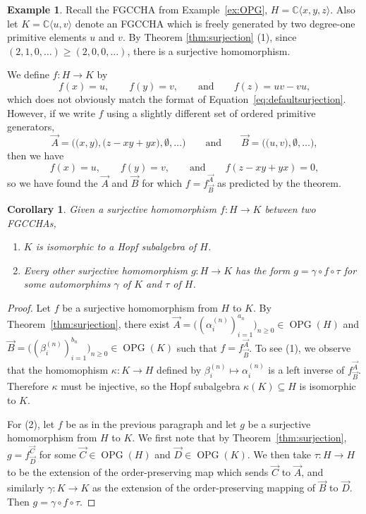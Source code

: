 \documentclass[11pt]{amsart}
\newtheorem{corollary}[theorem]{Corollary}
\theoremstyle{definition}
\newtheorem{example}[theorem]{Example}
\numberwithin{equation}{section}
\def\CC{{\mathbb C}}
\newcommand{\FGCCHA}{\textsf{FGCCHA}\xspace}
\newcommand{\FGCCHAs}{\textsf{FGCCHA}s\xspace}
\newcommand{\OPG}{\operatorname{OPG}}
\begin{document}
\begin{example}
\label{ex:quotientHopf}
Recall the \FGCCHA from Example~\ref{ex:OPG}, $H = \CC\langle x, y, z \rangle$.
Also let $K = \CC\langle u, v \rangle$ denote an \FGCCHA
which is freely generated by two degree-one primitive elements $u$ and $v$. 
By Theorem \ref{thm:surjection} (1), since $(2,1,0,\ldots) \geq (2,0,0,\ldots)$,
there is a surjective homomorphism.

We define $f: H \to K$ by
\[
f(x) = u,
\qquad
f(y) = v,
\qquad\text{and}\qquad
f(z) = uv-vu,
\]
which does not obviously match the format of Equation~\eqref{eq:defaultsurjection}.  However, if we write $f$ using a slightly different set of ordered primitive generators,
\[
\vec{A} = \Big(\big( x, y\big), \big( z - xy + yx \big), \emptyset, \ldots \Big)
\qquad
\text{and}
\qquad
\vec{B} =  \Big(\big( u, v\big), \emptyset, \ldots \Big),
\]
then we have 
\[
f(x) = u,
\qquad
f(y) = v,
\qquad\text{and}\qquad
f(z - xy + yx) = 0,
\]
so we have found the $\vec{A}$ and $\vec{B}$ for which $f = f^{\vec{A}}_{\vec{B}}$ as predicted by the theorem.
\end{example}

\begin{corollary}
Given a surjective homomorphism $f: H \to K$ between two \FGCCHAs,
\begin{enumerate}
\item $K$ is isomorphic to a Hopf subalgebra of $H$.

\item Every other surjective homomorphism $g: H \to K$ has the form
$g = \gamma \circ f \circ \tau$ for some automorphims $\gamma$ of $K$ and $\tau$ of $H$.

\end{enumerate}
\end{corollary}
\begin{proof}
Let $f$ be a surjective homomorphism from $H$ to $K$.  
By Theorem~\ref{thm:surjection}, there exist $\vec{A}  = \big( ( \alpha_{i}^{(n)})_{i = 1}^{a_{n}} \big)_{n \ge 0} \in \OPG(H)$ and $\vec{B}   = \big( ( \beta_{i}^{(n)})_{i = 1}^{b_{n}} \big)_{n \ge 0}  \in \OPG(K)$ such that $f = f^{\vec{A}}_{\vec{B}}$.  To see (1), we observe that the homomophism $\kappa: K \to H$ defined by $\beta^{(n)}_{i} \mapsto \alpha^{(n)}_{i}$ is a left inverse of $f^{\vec{A}}_{\vec{B}}$.  Therefore $\kappa$ must be injective, so the Hopf subalgebra $\kappa(K) \subseteq H$ is isomorphic to $K$.

For (2), let $f$ be as in the previous paragraph  and let $g$ be a surjective homomorphism from $H$ to $K$.  
We first note that by Theorem~\ref{thm:surjection},  $g = f^{\vec{C}}_{\vec{D}}$ for some $\vec{C} \in \OPG(H)$ and $\vec{D} \in \OPG(K)$.  We then take $\tau: H \to H$ to be the extension of the order-preserving map which sends $\vec{C}$ to $\vec{A}$, and similarly $\gamma: K \to K$ as the extension of the order-preserving mapping of $\vec{B}$ to $\vec{D}$.  Then $g = \gamma \circ f \circ \tau$.
\end{proof}
\end{document}
